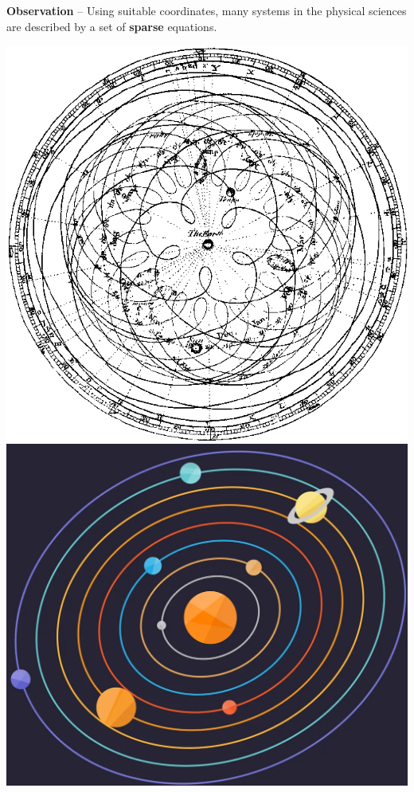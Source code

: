 \documentclass[aspectratio=169,compress,12pt,dvipsnames]{beamer}
\begin{document}
\begin{frame}[plain]
    \vfill
    \begin{minipage}{.68\textwidth}
        \textbf{Observation} -- Using suitable coordinates, many systems in the physical sciences are described by a set of \textbf{sparse} equations.
    \end{minipage}%
    \hfill
    \begin{minipage}{.28\textwidth}
        \centering
        \begin{overprint}
            \includegraphics[width=\textwidth]{imgs/ptolemaic_system.png}
            \includegraphics[width=\textwidth]{imgs/solar_system.png}
        \end{overprint}
    \end{minipage}
    \vfill
\end{frame}
\end{document}
